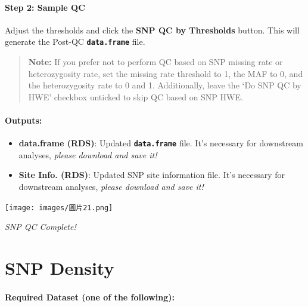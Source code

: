 \documentclass[
]{book}
\begin{document}
\paragraph*{Step 2: Sample QC}\label{step-2-sample-qc-1}

Adjust the thresholds and click the {\textbf{SNP QC by Thresholds}} button. This will generate the Post-QC {\textbf{\texttt{data.frame}}} file.

\begin{quote}
\textbf{Note:} If you prefer not to perform QC based on SNP missing rate or heterozygosity rate, set the missing rate threshold to 1, the MAF to 0, and the heterozygosity rate to 0 and 1. Additionally, leave the `Do SNP QC by HWE' checkbox unticked to skip QC based on SNP HWE.
\end{quote}

\paragraph*{Outputs:}\label{outputs-2}

\begin{itemize}
\item
  \textbf{data.frame (RDS)}: Updated {\textbf{\texttt{data.frame}}} file. It's necessary for downstream analyses, \emph{please download and save it!}
\item
  \textbf{Site Info. (RDS)}: Updated SNP site information file. It's necessary for downstream analyses, \emph{please download and save it!}
\end{itemize}

\texttt{[image: images/圖片21.png]}

\emph{SNP QC Complete!}

\section{SNP Density}\label{snp-density}

\paragraph*{Required Dataset (one of the following):}\label{required-dataset-one-of-the-following-3}
\end{document}
